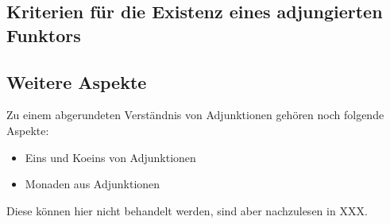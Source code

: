 \subsection{Kriterien für die Existenz eines adjungierten Funktors}


\subsection{Weitere Aspekte}

Zu einem abgerundeten Verständnis von Adjunktionen gehören noch folgende
Aspekte:
\begin{itemize}
\item Eins und Koeins von Adjunktionen
\item Monaden aus Adjunktionen
\end{itemize}
Diese können hier nicht behandelt werden, sind aber nachzulesen in XXX.


\endinput
\begin{exmp}
$\cC=Grp$, $\cD=Grp^2=Grp\times Grp$
\begin{align*}
F: & Grp^2\rightarrow Grp &\mbox{Produktfunktor}\\
  & (G_1,G_2) \mapsto G_1\times G_2\\
G: & Grp \rightarrow Grp^2 &\mbox{Diagonalfunktor}\\
  & G \mapsto (G,G)
\end{align*}
\paragraph{Beh:} $F\vdash G$
\[
\Hom_{Grp^2}((G,G),(H_1,H_2))\cong \Hom_{Grp}(G,H_1\times H_2)
\]
wobei
\begin{itemize}
\item $\Hom_{Grp^2}((G,G),(H_1,H_2))=\{\mbox{Gruppen-Homomorphismen}\}$
\item $ \Hom_{Grp}(G,H_1\times H_2) =\{G\rightarrow H_1\times H_2 \mbox{
Gruppen-Homomorphismen}\}$
\end{itemize}
\end{exmp}
\endinput

